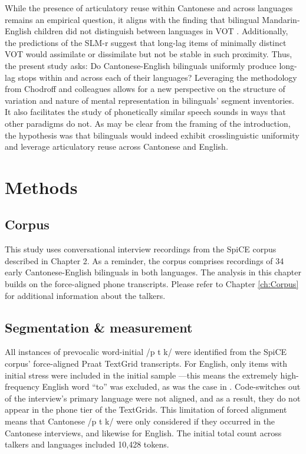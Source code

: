 While the presence of articulatory reuse within Cantonese and across languages remains an empirical question, it aligns with the finding that bilingual Mandarin-English children did not distinguish between languages in VOT \citep{yang_2019_vot}. Additionally, the predictions of the SLM-r \citep{flege_2021_slmr} suggest that long-lag items of minimally distinct VOT would assimilate or dissimilate but not be stable in such proximity. Thus, the present study asks: Do Cantonese-English bilinguals uniformly produce long-lag stops within and across each of their languages? Leveraging the methodology from Chodroff and colleagues \citep{chodroff_2017_structure, chodroff_2018_predictability, chodroff_2019_l2} allows for a new perspective on the structure of variation and nature of mental representation in bilinguals' segment inventories. It also facilitates the study of phonetically similar speech sounds in ways that other paradigms do not. As may be clear from the framing of the introduction, the hypothesis was that bilinguals would indeed exhibit crosslinguistic uniformity and leverage articulatory reuse across Cantonese and English.

\section{Methods}

\subsection{Corpus}
This study uses conversational interview recordings from the SpiCE corpus described in Chapter 2. As a reminder, the corpus comprises recordings of 34 early Cantonese-English bilinguals in both languages. The analysis in this chapter builds on the force-aligned phone transcripts. Please refer to Chapter \ref{ch:Corpus} for additional information about the talkers. 

\subsection{Segmentation \& measurement}

All instances of prevocalic word-initial /p t k/ were identified from the SpiCE corpus' force-aligned Praat TextGrid transcripts. For English, only items with initial stress were included in the initial sample \citep{lisker_1967_some}---this means the extremely high-frequency English word ``to'' was excluded, as was the case in \citet{chodroff_2017_structure}. Code-switches out of the interview's primary language were not aligned, and as a result, they do not appear in the phone tier of the TextGrids. This limitation of forced alignment means that Cantonese /p t k/ were only considered if they occurred in the Cantonese interviews, and likewise for English. The initial total count across talkers and languages included 10,428 tokens. 

